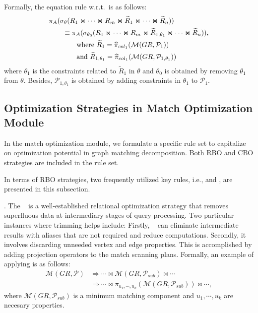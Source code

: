 Formally, the equation rule w.r.t.~\filterrule is as follows:
\begin{equation}
    \begin{split}
        & \pi_A(\sigma_{\theta}(R_1 \Join \cdots \Join R_m \Join \widetilde{R}_1 \Join \cdots \Join \widetilde{R}_n)) \\
        & \hspace*{2em} \equiv \pi_A(\sigma_{\theta_0}(R_1 \Join \cdots \Join R_m \Join \widetilde{R}_{1, \theta_1} \Join \cdots \Join \widetilde{R}_n)), \\
        & \hspace*{4em} \text{where } \widetilde{R}_{1} = \widehat{\pi}_{col_1}(\mathcal{M}(GR, \mathcal{P}_1)) \\
        & \hspace*{4em} \text{and } \widetilde{R}_{1,\theta_1} = \widehat{\pi}_{col_1}(\mathcal{M}(GR, \mathcal{P}_{1,\theta_1}))
    \end{split}
\end{equation}
where $\theta_1$ is the constraints related to $\widetilde{R}_1$ in $\theta$ and $\theta_0$ is obtained by removing $\theta_1$ from $\theta$.
Besides, $\mathcal{P}_{1,\theta_1}$ is obtained by adding constraints in $\theta_1$ to $\mathcal{P}_1$.


\subsection{Optimization Strategies in Match Optimization Module}

In the match optimization module, we formulate a specific rule set to capitalize on optimization potential in graph matching decomposition. 
Both RBO and CBO strategies are included in the rule set.

In terms of RBO strategies, two frequently utilized key rules, i.e., \trimrule and \fusionrule, are presented in this subsection.

\trimrule. 
The \trimrule~ is a well-established relational optimization strategy that removes superfluous data at intermediary stages of query processing. 
Two particular instances where trimming helps include: 
Firstly, \trimrule~ can eliminate intermediate results with aliases that are not required and reduce computations.
Secondly, it involves discarding unneeded vertex and edge properties.
This is accomplished by adding projection operators to the match scanning plans.
Formally, an example of applying \trimrule is as follows:
\begin{equation}
    \begin{split}
        \mathcal{M}(GR, \mathcal{P}) & \Rightarrow \cdots \Join \mathcal{M}(GR, \mathcal{P}_{sub}) \Join \cdots \\
        & \Rightarrow \cdots \Join \pi_{u_1, \cdots, u_k}(\mathcal{M}(GR, \mathcal{P}_{sub})) \Join \cdots,
    \end{split} 
\end{equation}
where $\mathcal{M}(GR, \mathcal{P}_{sub})$ is a minimum matching component and $u_1, \cdots, u_k$ are necesary properties.

